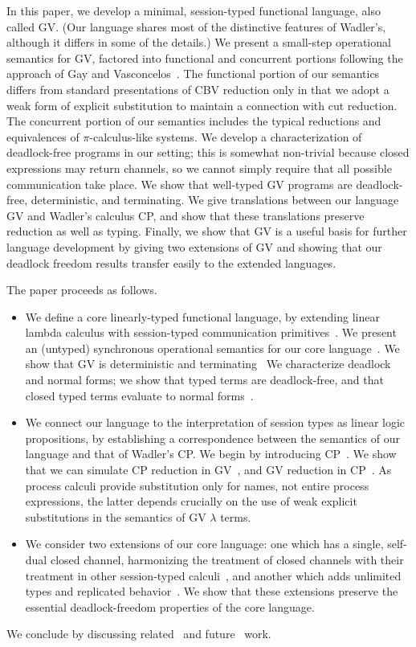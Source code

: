 \documentclass[oribibl,orivec,envcountsame]{llncs}
\begin{document}
In this paper, we develop a minimal, session-typed functional language, also called GV.  (Our
language shares most of the distinctive features of Wadler's, although it differs in some of the
details.) We present a small-step operational semantics for GV, factored into functional and
concurrent portions following the approach of Gay and Vasconcelos~\cite{GayVasconcelos10}. The
functional portion of our semantics differs from standard presentations of CBV reduction only in
that we adopt a weak form of explicit substitution to maintain a connection with cut reduction. The
concurrent portion of our semantics includes the typical reductions and equivalences of
$\pi$-calculus-like systems. We develop a characterization of deadlock-free programs in our setting;
this is somewhat non-trivial because closed expressions may return channels, so we cannot simply
require that all possible communication take place. We show that well-typed GV programs are
deadlock-free, deterministic, and terminating. We give translations between our language GV and
Wadler's calculus CP, and show that these translations preserve reduction as well as typing.
Finally, we show that GV is a useful basis for further language development by giving two extensions
of GV and showing that our deadlock freedom results transfer easily to the extended languages.

The paper proceeds as follows.
\begin{itemize}
\item We define a core linearly-typed functional language, by extending linear lambda calculus with
  session-typed communication primitives~. We present an (untyped) synchronous
  operational semantics for our core language~. We show that GV is deterministic
  and terminating~ We characterize deadlock and normal forms; we show that typed
  terms are deadlock-free, and that closed typed terms evaluate to normal
  forms~.
\item We connect our language to the interpretation of session types as linear logic propositions,
  by establishing a correspondence between the semantics of our language and that of Wadler's CP. We
  begin by introducing CP~. We show that we can simulate CP reduction in
  GV~, and GV reduction in CP~. As process calculi provide substitution
  only for names, not entire process expressions, the latter depends crucially on the use of weak
  explicit substitutions in the semantics of GV $\lambda$ terms.
\item We consider two extensions of our core language: one which has a single, self-dual closed
  channel, harmonizing the treatment of closed channels with their treatment in other session-typed
  calculi~, and another which adds unlimited types and replicated
  behavior~. We show that these extensions preserve the essential deadlock-freedom
  properties of the core language.
\end{itemize}
We conclude by discussing related~ and future~ work.
\end{document}
